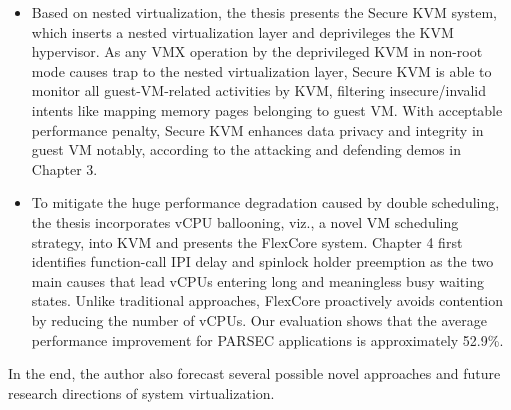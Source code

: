 \begin{englishabstract}
\begin{itemize}
\item Based on nested virtualization, the thesis presents the Secure KVM system, which inserts a nested virtualization layer and deprivileges the KVM hypervisor. As any VMX operation by the deprivileged KVM in non-root mode causes trap to the nested virtualization layer, Secure KVM is able to monitor all guest-VM-related activities by KVM, filtering insecure/invalid intents like mapping memory pages belonging to guest VM. With acceptable performance penalty, Secure KVM enhances data privacy and integrity in guest VM notably, according to the attacking and defending demos in Chapter 3.
\item To mitigate the huge performance degradation caused by double scheduling, the thesis incorporates vCPU ballooning, viz., a novel VM scheduling strategy, into KVM and presents the FlexCore system. Chapter 4 first identifies function-call IPI delay and spinlock holder preemption as the two main causes that lead vCPUs entering long and meaningless busy waiting states. Unlike traditional approaches, FlexCore proactively avoids contention by reducing the number of vCPUs. Our evaluation shows that the average performance improvement for PARSEC applications is approximately 52.9\%.
\end{itemize}

In the end, the author also forecast several possible novel approaches and future research directions of system virtualization.


\end{englishabstract}
